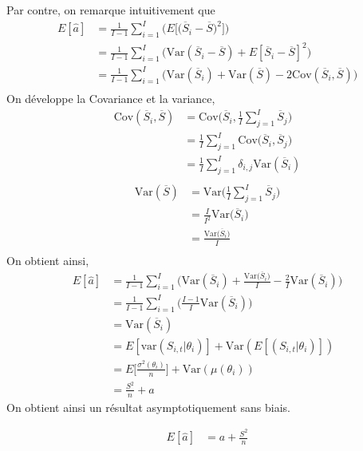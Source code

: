 Par contre, on remarque intuitivement que
\begin{align*}
E[\widehat{a}] &= \frac{1}{I - 1}\sum_{i=1}^{I}\Bigg( E\Big[  \big( \overline{S}_i - \overline{S} \big)^2 \Big]\Bigg) \\
&= \frac{1}{I - 1}\sum_{i=1}^{I}\Bigg( \text{Var}(\overline{S}_i - \overline{S}) + E[\overline{S}_i - \overline{S}]^2 \Bigg) \\
&= \frac{1}{I - 1}\sum_{i=1}^{I}\Bigg( \text{Var}(\overline{S}_i) + \text{Var}(\overline{S}) -2 \text{Cov}(\overline{S}_i, \overline{S}) \Bigg) \\
\end{align*}
On développe la Covariance et la variance,
\begin{align*}
\text{Cov}(\overline{S}_i, \overline{S}) &= \text{Cov}\Big(\overline{S}_i, \frac{1}{I}\sum_{j=1}^{I} \overline{S}_j\Big) \\
&= \frac{1}{I} \sum_{j=1}^{I} \text{Cov}\Big(\overline{S}_i,\overline{S}_j\Big) \\
&= \frac{1}{I} \sum_{j=1}^{I} \delta_{i,j} \text{Var}(\overline{S}_i) \\
\end{align*}
\begin{align*}
\text{Var}(\overline{S}) &= \text{Var}\Big(\frac{1}{I}\sum_{j=1}^{I} \overline{S}_j\Big) \\
&= \frac{I}{I^2} \text{Var}\Big(\overline{S}_i\Big) \\
&= \frac{\text{Var}\Big(\overline{S}_i\Big)}{I}  \\
\end{align*}
On obtient ainsi,
\begin{align*}
E[\widehat{a}] &= \frac{1}{I - 1}\sum_{i=1}^{I}\Bigg( \text{Var}(\overline{S}_i) + \frac{\text{Var}\Big(\overline{S}_i\Big)}{I} - \frac{2}{I} \text{Var}(\overline{S}_i) \Bigg) \\
&=  \frac{1}{I - 1}\sum_{i=1}^{I}\Bigg(\frac{I - 1}{I} \text{Var}(\overline{S}_i)\Bigg) \\
&= \text{Var}(\overline{S}_i) \\
&= E[\text{var}(S_{i,t}|\theta_i)] + \text{Var}(E[(S_{i,t}|\theta_i)]) \\
&= E\Big[ \frac{\sigma^2(\theta_i)}{n}\Big] + \text{Var}(\mu(\theta_i)) \\
&= \frac{S^2}{n} + a
\end{align*}
On obtient ainsi un résultat asymptotiquement sans biais.

\begin{align*}
E[\widehat{a}] &= a + \frac{S^2}{n}
\end{align*}


